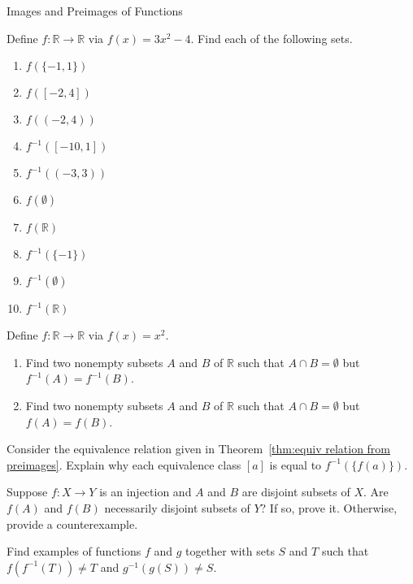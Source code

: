 \begin{section}{Images and Preimages of Functions}
\begin{problem}
Define $f:\mathbb{R}\to\mathbb{R}$ via $f(x)=3x^2-4$.
Find each of the following sets.
\begin{enumerate}[label=\textrm{(\alph*)}]
\item $f(\{-1,1\})$
\item $f([-2,4])$
\item $f((-2,4))$
\item $f^{-1}([-10,1])$
\item $f^{-1}((-3,3))$
\item $f(\emptyset)$
\item $f(\mathbb{R})$
\item $f^{-1}(\{-1\})$
\item $f^{-1}(\emptyset)$
\item $f^{-1}(\mathbb{R})$
\end{enumerate}
\end{problem}

\begin{problem}
Define $f:\mathbb{R}\to\mathbb{R}$ via $f(x)=x^2$.
\begin{enumerate}[label=\textrm{(\alph*)}]
\item Find two nonempty subsets $A$ and $B$ of $\mathbb{R}$ such that $A\cap B=\emptyset$ but $f^{-1}(A)=f^{-1}(B)$.
\item Find two nonempty subsets $A$ and $B$ of $\mathbb{R}$ such that $A\cap B=\emptyset$ but $f(A)=f(B)$.
\end{enumerate}
\end{problem}

\begin{problem}
Consider the equivalence relation given in Theorem~\ref{thm:equiv relation from preimages}. Explain why each equivalence class $[a]$ is equal to $f^{-1}(\{f(a)\})$.
\end{problem}

\begin{problem}
Suppose $f:X\to Y$ is an injection and $A$ and $B$ are disjoint subsets of $X$. Are $f(A)$ and $f(B)$ necessarily disjoint subsets of $Y$?  If so, prove it. Otherwise, provide a counterexample.
\end{problem}

\begin{problem}
Find examples of functions $f$ and $g$ together with sets $S$ and $T$ such that $f(f^{-1}(T))\neq T$ and $g^{-1}(g(S))\neq S$.
\end{problem}


\end{section}
